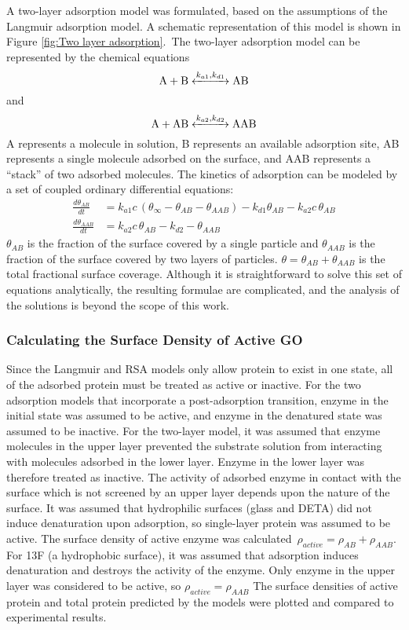 A two-layer adsorption model was formulated, based on the assumptions
of the Langmuir adsorption model. A schematic representation of this
model is shown in Figure \ref{fig:Two layer adsorption}.~The two-layer
adsorption model can be represented by the chemical equations \[ \cee{A + B <->[k_{a1},k_{d1}] AB} \]
and \[ \cee{A + AB <->[k_{a2},k_{d2}] AAB} \] A represents a molecule
in solution, B represents an available adsorption site, AB represents
a single molecule adsorbed on the surface, and AAB represents a {}``stack''
of two adsorbed molecules. The kinetics of adsorption can be modeled
by a set of coupled ordinary differential equations:\begin{align}
\frac{d\theta_{AB}}{dt} & =k_{a1}c\,\left(\theta_{\infty}-\theta_{AB}-\theta_{AAB}\right)-k_{d1}\theta_{AB}-k_{a2}c\,\theta_{AB}\label{eq:Two Layer AB}\\
\frac{d\theta_{AAB}}{dt} & =k_{a2}c\,\theta_{AB}-k_{d2}-\theta_{AAB}\label{eq:Two Layer AAB}\end{align}
$\theta_{AB}$ is the fraction of the surface covered by a single
particle and $\theta_{AAB}$ is the fraction of the surface covered
by two layers of particles. $\theta=\theta_{AB}+\theta_{AAB}$ is
the total fractional surface coverage. Although it is straightforward
to solve this set of equations analytically, the resulting formulae
are complicated, and the analysis of the solutions is beyond the scope
of this work. 


\subsubsection{Calculating the Surface Density of Active GO }

Since the Langmuir and RSA models only allow protein to exist in one
state, all of the adsorbed protein must be treated as active or inactive.
For the two adsorption models that incorporate a post-adsorption transition,
enzyme in the initial state was assumed to be active, and enzyme in
the denatured state was assumed to be inactive. For the two-layer
model, it was assumed that enzyme molecules in the upper layer prevented
the substrate solution from interacting with molecules adsorbed in
the lower layer. Enzyme in the lower layer was therefore treated as
inactive. The activity of adsorbed enzyme in contact with the surface
which is not screened by an upper layer depends upon the nature of
the surface. It was assumed that hydrophilic surfaces (glass and DETA)
did not induce denaturation upon adsorption, so single-layer protein
was assumed to be active. The surface density of active enzyme was
calculated~$\rho_{active}=\rho_{AB}+\rho_{AAB}$. For 13F (a hydrophobic
surface), it was assumed that adsorption induces denaturation and
destroys the activity of the enzyme. Only enzyme in the upper layer
was considered to be active, so $\rho_{active}=\rho_{AAB}$ The surface
densities of active protein and total protein predicted by the models
were plotted and compared to experimental results. 


